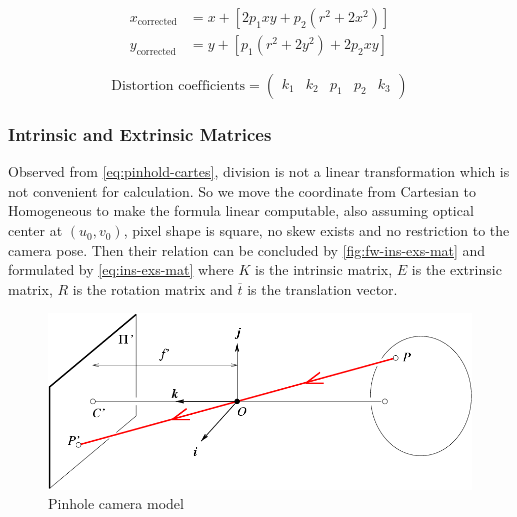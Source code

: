 \begin{equation}
\begin{aligned} x_{\text {corrected}} &=x+\left[2 p_{1} x y+p_{2}\left(r^{2}+2
x^{2}\right)\right] \\ y_{\text {corrected}} &=y+\left[p_{1}\left(r^{2}+2
y^{2}\right)+2 p_{2} x y\right] \end{aligned}
\label{eq:tangential}
\end{equation}

\begin{equation}
\text {Distortion coefficients}=\left( \begin{array}{lllll}{k_{1}} & {k_{2}} &
{p_{1}} & {p_{2}} & {k_{3}}\end{array}\right)
\label{eq:disortion-model}
\end{equation}

\subsubsection{Intrinsic and Extrinsic Matrices}
\label{sec:Impl-ins-exs-mat}

Observed from \autoref{eq:pinhold-cartes}, division is not a linear
transformation which is not convenient for calculation. So we move the
coordinate from Cartesian to Homogeneous to make the formula linear
computable, also assuming optical center at $(u_0, v_0)$, pixel shape is
square, no skew exists and no restriction to the camera pose.
Then their relation can be concluded by \autoref{fig:fw-ins-exs-mat} and
formulated by \autoref{eq:ins-exs-mat} where $K$ is the intrinsic matrix, $E$
is the extrinsic matrix, $R$ is the rotation matrix and $\overline{t}$ is the
translation vector.

\begin{figure}
    \includegraphics[width=\linewidth]{figures/framework_pinhole_camera.png}
    \caption{Pinhole camera model}
    \label{fig:fw-pinhole}
\end{figure}

